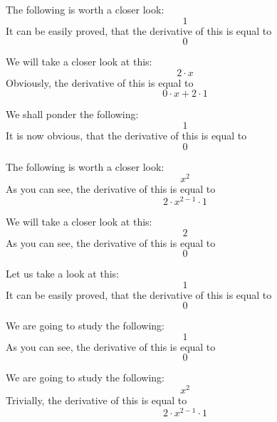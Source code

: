 \documentclass{article}
\begin{document}
The following is worth a closer look:
\begin{equation}
1 
\end{equation}
It can be easily proved, that the derivative of this is equal to
\begin{equation}
0 
\end{equation}

We will take a closer look at this:
\begin{equation}
2 \cdot x 
\end{equation}
Obviously, the derivative of this is equal to
\begin{equation}
0 \cdot x + 2 \cdot 1 
\end{equation}

We shall ponder the following:
\begin{equation}
1 
\end{equation}
It is now obvious, that the derivative of this is equal to
\begin{equation}
0 
\end{equation}

The following is worth a closer look:
\begin{equation}
x ^{2 } 
\end{equation}
As you can see, the derivative of this is equal to
\begin{equation}
2 \cdot x ^{2 - 1 } \cdot 1 
\end{equation}

We will take a closer look at this:
\begin{equation}
2 
\end{equation}
As you can see, the derivative of this is equal to
\begin{equation}
0 
\end{equation}

Let us take a look at this:
\begin{equation}
1 
\end{equation}
It can be easily proved, that the derivative of this is equal to
\begin{equation}
0 
\end{equation}

We are going to study the following:
\begin{equation}
1 
\end{equation}
As you can see, the derivative of this is equal to
\begin{equation}
0 
\end{equation}

We are going to study the following:
\begin{equation}
x ^{2 } 
\end{equation}
Trivially, the derivative of this is equal to
\begin{equation}
2 \cdot x ^{2 - 1 } \cdot 1 
\end{equation}
\end{document}
